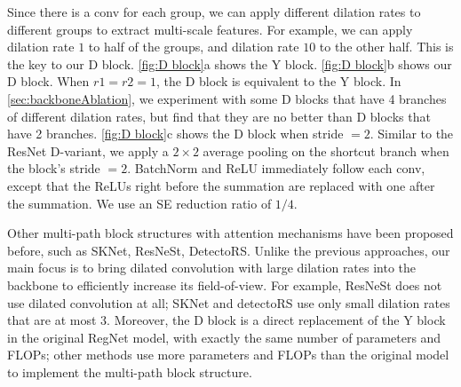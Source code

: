 \documentclass[10pt,twocolumn,letterpaper]{article}
\begin{document}
Since there is a conv for each group, we can apply different dilation rates to different groups to extract multi-scale features. For example, we can apply dilation rate $1$ to half of the groups, and dilation rate $10$ to the other half. This is the key to our D block. \cref{fig:D block}a shows the Y block. \cref{fig:D block}b shows our D block. When $r1=r2=1$, the D block is equivalent to the Y block. In \cref{sec:backboneAblation}, we experiment with some D blocks that have 4 branches of different dilation rates, but find that they are no better than D blocks that have 2 branches. \cref{fig:D block}c shows the D block when stride $=2$. Similar to the ResNet D-variant\cite{resnetd}, we apply a $2\times 2$ average pooling on the shortcut branch when the block's stride $=2$. BatchNorm\cite{batchnorm} and ReLU immediately follow each conv, except that the ReLUs right before the summation are replaced with one after the summation. We use an SE\cite{hu2018squeeze} reduction ratio of $1/4$.



Other multi-path block structures with attention mechanisms have been proposed before, such as SKNet\cite{sknet}, ResNeSt\cite{resnest}, DetectoRS\cite{detectoRS}. Unlike the previous approaches, our main focus is to bring dilated convolution with large dilation rates into the backbone to efficiently increase its field-of-view. For example, ResNeSt does not use dilated convolution at all; SKNet and detectoRS use only small dilation rates that are at most 3. Moreover, the D block is a direct replacement of the Y block in the original RegNet model, with exactly the same number of parameters and FLOPs; other methods use more parameters and FLOPs than the original model to implement the multi-path block structure.
\end{document}
